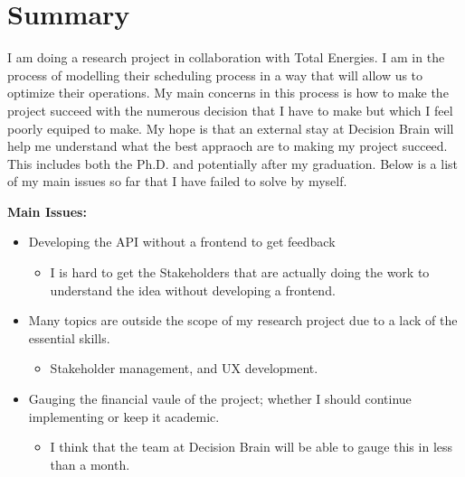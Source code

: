 \section*{Summary}
I am doing a research project in collaboration with Total Energies. I am in the process of modelling 
their scheduling process in a way that will allow us to optimize their operations. My main concerns
in this process is how to make the project succeed with the numerous decision that I have to make but 
which I feel poorly equiped to make. My hope is that an external stay at Decision Brain will help
me understand what the best appraoch are to making my project succeed. This includes both the Ph.D. and 
potentially after my graduation. Below is a list of my main issues so far that I have failed to solve by myself. 

\textbf{Main Issues:}
\begin{itemize}
	\item Developing the API without a frontend to get feedback 
	\begin{itemize}
		\item I is hard to get the Stakeholders that are actually doing the work to understand the idea without developing a frontend.
	\end{itemize}
	\item Many topics are outside the scope of my research project due to a lack of the essential skills. 
	\begin{itemize}
		\item Stakeholder management, and UX development.
	\end{itemize}
	\item Gauging the financial vaule of the project; whether I should continue implementing or keep it academic. 
	\begin{itemize}
		\item I think that the team at Decision Brain will be able to gauge this in less than a month.	
	\end{itemize}
\end{itemize}
